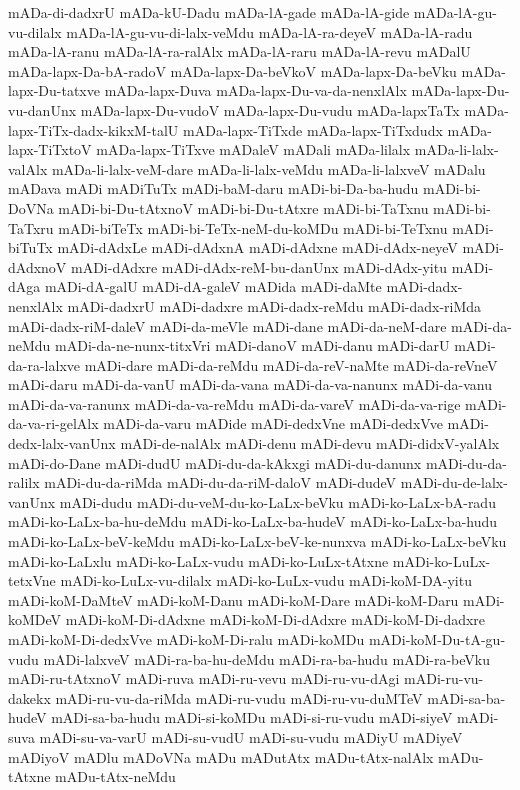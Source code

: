 {mADa-di-dadxrU
mADa-kU-Dadu
mADa-lA-gade
mADa-lA-gide
mADa-lA-gu-vu-dilalx
mADa-lA-gu-vu-di-lalx-veMdu
mADa-lA-ra-deyeV
mADa-lA-radu
mADa-lA-ranu
mADa-lA-ra-ralAlx
mADa-lA-raru
mADa-lA-revu
mADalU
mADa-lapx-Da-bA-radoV
mADa-lapx-Da-beVkoV
mADa-lapx-Da-beVku
mADa-lapx-Du-tatxve
mADa-lapx-Duva
mADa-lapx-Du-va-da-nenxlAlx
mADa-lapx-Du-vu-danUnx
mADa-lapx-Du-vudoV
mADa-lapx-Du-vudu
mADa-lapxTaTx
mADa-lapx-TiTx-dadx-kikxM-talU
mADa-lapx-TiTxde
mADa-lapx-TiTxdudx
mADa-lapx-TiTxtoV
mADa-lapx-TiTxve
mADaleV
mADali
mADa-lilalx
mADa-li-lalx-valAlx
mADa-li-lalx-veM-dare
mADa-li-lalx-veMdu
mADa-li-lalxveV
mADalu
mADava
mADi
mADiTuTx
mADi-baM-daru
mADi-bi-Da-ba-hudu
mADi-bi-DoVNa
mADi-bi-Du-tAtxnoV
mADi-bi-Du-tAtxre
mADi-bi-TaTxnu
mADi-bi-TaTxru
mADi-biTeTx
mADi-bi-TeTx-neM-du-koMDu
mADi-bi-TeTxnu
mADi-biTuTx
mADi-dAdxLe
mADi-dAdxnA
mADi-dAdxne
mADi-dAdx-neyeV
mADi-dAdxnoV
mADi-dAdxre
mADi-dAdx-reM-bu-danUnx
mADi-dAdx-yitu
mADi-dAga
mADi-dA-galU
mADi-dA-galeV
mADida
mADi-daMte
mADi-dadx-nenxlAlx
mADi-dadxrU
mADi-dadxre
mADi-dadx-reMdu
mADi-dadx-riMda
mADi-dadx-riM-daleV
mADi-da-meVle
mADi-dane
mADi-da-neM-dare
mADi-da-neMdu
mADi-da-ne-nunx-titxVri
mADi-danoV
mADi-danu
mADi-darU
mADi-da-ra-lalxve
mADi-dare
mADi-da-reMdu
mADi-da-reV-naMte
mADi-da-reVneV
mADi-daru
mADi-da-vanU
mADi-da-vana
mADi-da-va-nanunx
mADi-da-vanu
mADi-da-va-ranunx
mADi-da-va-reMdu
mADi-da-vareV
mADi-da-va-rige
mADi-da-va-ri-gelAlx
mADi-da-varu
mADide
mADi-dedxVne
mADi-dedxVve
mADi-dedx-lalx-vanUnx
mADi-de-nalAlx
mADi-denu
mADi-devu
mADi-didxV-yalAlx
mADi-do-Dane
mADi-dudU
mADi-du-da-kAkxgi
mADi-du-danunx
mADi-du-da-ralilx
mADi-du-da-riMda
mADi-du-da-riM-daloV
mADi-dudeV
mADi-du-de-lalx-vanUnx
mADi-dudu
mADi-du-veM-du-ko-LaLx-beVku
mADi-ko-LaLx-bA-radu
mADi-ko-LaLx-ba-hu-deMdu
mADi-ko-LaLx-ba-hudeV
mADi-ko-LaLx-ba-hudu
mADi-ko-LaLx-beV-keMdu
mADi-ko-LaLx-beV-ke-nunxva
mADi-ko-LaLx-beVku
mADi-ko-LaLxlu
mADi-ko-LaLx-vudu
mADi-ko-LuLx-tAtxne
mADi-ko-LuLx-tetxVne
mADi-ko-LuLx-vu-dilalx
mADi-ko-LuLx-vudu
mADi-koM-DA-yitu
mADi-koM-DaMteV
mADi-koM-Danu
mADi-koM-Dare
mADi-koM-Daru
mADi-koMDeV
mADi-koM-Di-dAdxne
mADi-koM-Di-dAdxre
mADi-koM-Di-dadxre
mADi-koM-Di-dedxVve
mADi-koM-Di-ralu
mADi-koMDu
mADi-koM-Du-tA-gu-vudu
mADi-lalxveV
mADi-ra-ba-hu-deMdu
mADi-ra-ba-hudu
mADi-ra-beVku
mADi-ru-tAtxnoV
mADi-ruva
mADi-ru-vevu
mADi-ru-vu-dAgi
mADi-ru-vu-dakekx
mADi-ru-vu-da-riMda
mADi-ru-vudu
mADi-ru-vu-duMTeV
mADi-sa-ba-hudeV
mADi-sa-ba-hudu
mADi-si-koMDu
mADi-si-ru-vudu
mADi-siyeV
mADi-suva
mADi-su-va-varU
mADi-su-vudU
mADi-su-vudu
mADiyU
mADiyeV
mADiyoV
mADlu
mADoVNa
mADu
mADutAtx
mADu-tAtx-nalAlx
mADu-tAtxne
mADu-tAtx-neMdu
}
